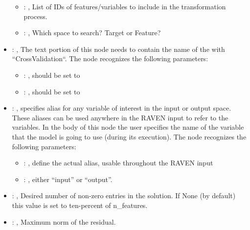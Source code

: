 \begin{itemize}
\begin{itemize}
        \item {}: , 
          List of IDs of features/variables to include in the transformation process.

        \item {}: , 
          Which space to search? Target or Feature?
      \end{itemize}

    \item {}: , 
      The text portion of this node needs to contain the name of the  with
               ``CrossValidation``.
      The  node recognizes the following parameters:
        \begin{itemize}
          \item {}: , 
            should be set to 
          \item {}: , 
            should be set to 
      \end{itemize}

    \item {}: , 
      specifies alias for         any variable of interest in the input or output space. These
      aliases can be used anywhere in the RAVEN input to         refer to the variables. In the body
      of this node the user specifies the name of the variable that the model is going to use
      (during its execution).
      The  node recognizes the following parameters:
        \begin{itemize}
          \item {}: , 
            define the actual alias, usable throughout the RAVEN input
          \item {}: , 
            either ``input'' or ``output''.
      \end{itemize}

    \item {}: , 
      Desired number of non-zero entries in the solution. If None (by default)
      this value is set to ten-percent of n\_features.

    \item {}: , 
      Maximum norm of the residual.


\end{itemize}

